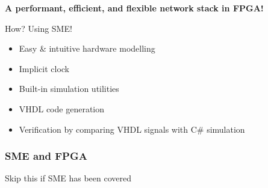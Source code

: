 \documentclass{beamer}
\begin{document}
\begin{frame}
\begin{center}
  \textbf{A performant, efficient, and flexible network stack in FPGA!}
\end{center}

\begin{block}{How?    Using SME!}
  \begin{itemize}
    \item Easy \& intuitive hardware modelling
    \item Implicit clock
    \item Built-in simulation utilities
    \item VHDL code generation
    \item Verification by comparing VHDL signals with C\# simulation
  \end{itemize}
\end{block}

\end{frame}

\begin{frame}
  \frametitle{SME and FPGA}

  Skip this if SME has been covered
\end{frame}
\end{document}
